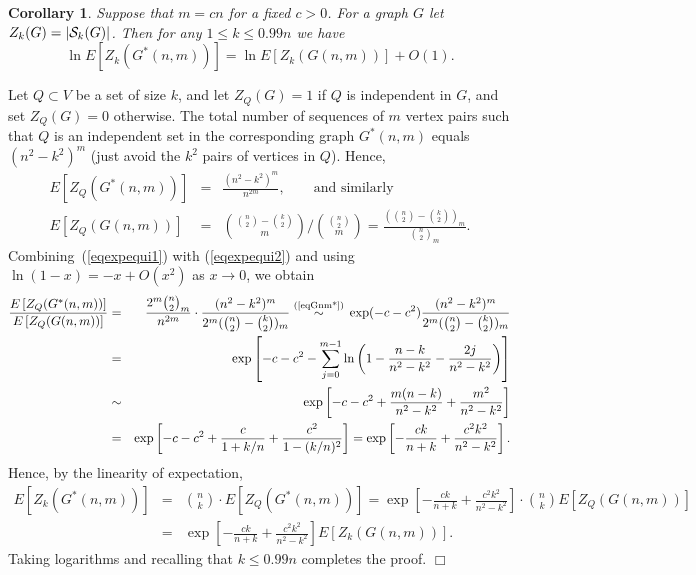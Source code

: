 \documentclass[a4paper,10pt]{article}
\makeatletter
\newtheorem{corollary}{Corollary}\renewcommand{\thecorollary}{\arabic{corollary}}
\newenvironment{proof}{\noindent{\bf Proof\@:}}{\hfill $\Box$\\}
\newcommand{\bink}[2] {{{#1}\choose {#2}}}
\newcommand\ra{\rightarrow}
\newcommand\bc[1]{\left({#1}\right)}
\newcommand\brk[1]{\left\lbrack{#1}\right\rbrack}
\newcommand{\stacksign}[2]{{\stackrel{\mbox{\scriptsize #1}}{#2}}}
\makeatother
\begin{document}
\begin{corollary}\label{corollary:expectation-equivalence}
Suppose that $m=cn$ for a fixed $c>0$.
For a graph $G$ let $Z_k(G)=|{\cal S}_k(G)|$.
Then for any $1\leq k\leq 0.99n$ we have
\begin{displaymath}
\ln E[Z_k(G^*(n,m))] =\ln  E[Z_k(G(n,m))]+O(1).
\end{displaymath}
\end{corollary}
\begin{proof}
Let $Q\subset V$ be a set of size $k$, and let $Z_Q(G)=1$ if $Q$ is
independent in $G$, and set $Z_Q(G)=0$ otherwise. The total number
of sequences of $m$ vertex pairs such that $Q$ is an independent set
in the corresponding graph $G^*(n,m)$ equals
	$(n^2-k^2)^m$ (just avoid the $k^2$ pairs of vertices in $Q$).
Hence,
	\begin{eqnarray}\label{eqexpequi1}
	E\brk{Z_Q(G^*(n,m))}&=&\frac{(n^2-k^2)^m}{n^{2m}},\qquad\mbox{and similarly}\\
	E\brk{Z_Q(G(n,m))}&=&\bink{\bink{n}2-\bink k2}m/\bink{\bink n2}m=\frac{(\bink{n}2-\bink k2)_m}{\bink n2_m}.	\label{eqexpequi2}
	\end{eqnarray}
Combining~(\ref{eqexpequi1}) with (\ref{eqexpequi2}) and using
$\ln(1-x)=-x+O(x^2)$ as $x\ra0$, we obtain
	\begin{eqnarray*}
	\frac{E\brk{Z_Q(G^*(n,m))}}{E\brk{Z_Q(G(n,m))}}
		&=&\frac{2^m\bink n2_m}{n^{2m}}\cdot\frac{(n^2-k^2)^m}{2^m(\bink n2-\bink k2)_m}
			\;\stacksign{(\ref{eqGnm*})}{\sim}\;
				\exp(-c-c^2)\frac{(n^2-k^2)^m}{2^m(\bink n2-\bink k2)_m}\\
		&=&\exp\brk{-c-c^2-\sum_{j=0}^{m-1}\ln\bc{1-\frac{n-k}{n^2-k^2}-\frac{2j}{n^2-k^2}}}\\
		&\sim&\exp\brk{-c-c^2+\frac{m(n-k)}{n^2-k^2}+\frac{m^2}{n^2-k^2}}\\
		&=&\exp\brk{-c-c^2+\frac{c}{1+k/n}+\frac{c^2}{1-(k/n)^2}}
				=\exp\brk{-\frac{ck}{n+k}+\frac{c^2k^2}{n^2-k^2}}.
	\end{eqnarray*}
Hence, by the linearity of expectation,
	\begin{eqnarray*}
	E[Z_k(G^*(n,m))]&=&\bink nk\cdot E\brk{Z_Q(G^*(n,m))}
			=\exp\brk{-\frac{ck}{n+k}+\frac{c^2k^2}{n^2-k^2}}\cdot \bink nk E\brk{Z_Q(G(n,m))}\\
		&=&\exp\brk{-\frac{ck}{n+k}+\frac{c^2k^2}{n^2-k^2}}E[Z_k(G(n,m))].
	\end{eqnarray*}
Taking logarithms and recalling that $k\leq0.99n$ completes the proof.
\end{proof}
\end{document}
